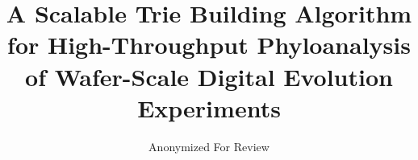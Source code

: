 \title{A Scalable Trie Building Algorithm for High-Throughput Phyloanalysis of Wafer-Scale Digital Evolution Experiments}

\author{
    Anonymized For Review
}

\maketitle


\maketitle
